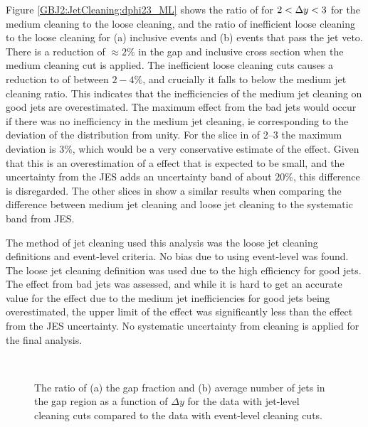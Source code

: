Figure \ref{GBJ2:JetCleaning:dphi23_ML} shows the ratio of \dphiDist for $2<\mbox{$\Delta y$}{}<3$ for the medium cleaning to the loose cleaning, and the ratio of inefficient loose cleaning to the loose cleaning for (a) inclusive events and (b) events that pass the jet veto.
There is a reduction of $\approx 2\%$ in the gap and inclusive cross section when the medium cleaning cut is applied.
The inefficient loose cleaning cuts causes a reduction to \dphiDist{} of between $2-4\%$, and crucially it falls to below the medium jet cleaning ratio. 
This indicates that the inefficiencies of the medium jet cleaning on good jets are overestimated.
The maximum effect from the bad jets would occur if there was no inefficiency in the medium jet cleaning, ie corresponding to the deviation of the distribution from unity. 
For the slice in \dy{} of 2--3 the maximum deviation is $3\%$, which would be a very conservative estimate of the effect.
Given that this is an overestimation of a effect that is expected to be small, and the uncertainty from the JES adds an uncertainty band of about $20\%$, this difference is disregarded. 
The other slices in \dy{} show a similar results when comparing the difference between medium jet cleaning and loose jet cleaning to the systematic band from JES.


The method of jet cleaning used this analysis was the loose jet cleaning definitions and event-level criteria.
No bias due to using event-level was found. 
The loose jet cleaning definition was used due to the high efficiency for good jets.
The effect from bad jets was assessed, and while it is hard to get an accurate value for the effect due to the medium jet inefficiencies for good jets being overestimated, the upper limit of the effect was significantly less than the effect from the JES uncertainty. 
No systematic uncertainty from cleaning is applied for the final analysis.


\begin{figure}
\centering
\mbox{
              \quad
              \quad
                              }
\caption[Comparison between event-level and jet-level cleaning criteria for the loose jet cleaning definition for (a) the gap fraction and (b) the average number of jets as a function of \dy{}]{
The ratio of (a) the gap fraction and (b) average number of jets in the gap region as a function of $\Delta y$ for the data with jet-level cleaning cuts compared to the data with event-level cleaning cuts.
\label{GBJ2:JetCleaning:gap}}
\end{figure}


